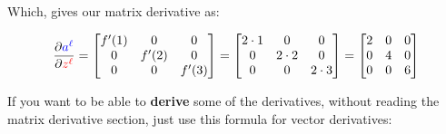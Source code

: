         Which, gives our matrix derivative as:
        
        \begin{equation*}
            \frac{\partial \textcolor{blue}{a^\ell}}{\partial \textcolor{red}{z^\ell}}
            =
            \begin{bmatrix}
                f'(1) & 0         & 0         \\
                0        & f'(2) & 0         \\
                0        & 0         & f'(3) \\
            \end{bmatrix}
            =
            \begin{bmatrix}
                2\cdot 1 & 0         & 0         \\
                0        & 2 \cdot 2 & 0         \\
                0        & 0         & 2 \cdot 3 \\
            \end{bmatrix}
            =
            \begin{bmatrix}
                2 & 0 & 0  \\
                0 & 4 & 0  \\
                0 & 0 & 6  \\
            \end{bmatrix}
        \end{equation*}
        
        If you want to be able to \textbf{derive} some of the derivatives, without reading the matrix derivative section, just use this formula for vector derivatives:
        
